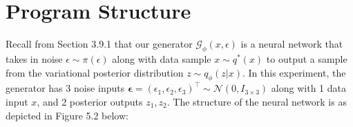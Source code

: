 \documentclass[honours,12pt]{unswthesis}
\numberwithin{equation}{section}
\theoremstyle{definition}
\begin{document}
\section{Program Structure}
Recall from Section 3.9.1 that our generator $\mathcal{G}_\phi(x,\epsilon)$ is a neural network that takes in noise $\epsilon\sim \pi(\epsilon)$ along with data sample $x\sim q^*(x)$ to output a sample from the variational posterior distribution $z\sim q_\phi(z|x)$. In this experiment, the generator has 3 noise inputs $\bm{\epsilon}=(\epsilon_1,\epsilon_2,\epsilon_3)^\top \sim \mathcal{N}(0,I_{3\times 3})$ along with 1 data input $x$, and 2 posterior outputs $z_1, z_2$. The structure of the neural network is as depicted in Figure 5.2 below:
\begin{figure}[h!]
\end{figure}
\end{document}
